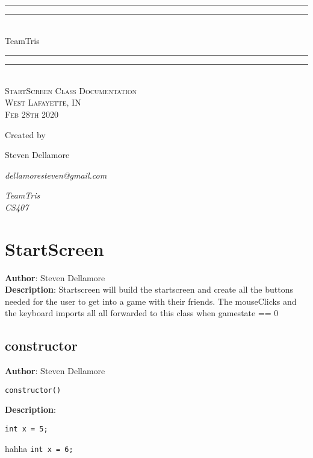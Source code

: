 \documentclass[12pt]{article}
\newlength{\drop}
\begin{document}
  \begin{titlepage}
    \centering
    \textheight
    \vspace*{7\baselineskip}
    \rule{\textwidth}{1.6pt}\vspace*{-\baselineskip}\vspace*{2pt}
    \rule{\textwidth}{0.4pt}\\[\baselineskip]
    {\LARGE TeamTris}\\[0.2\baselineskip]
    \rule{\textwidth}{0.4pt}\vspace*{-\baselineskip}\vspace{3.2pt}
    \rule{\textwidth}{1.6pt}\\[\baselineskip]
    \scshape
    StartScreen Class Documentation \\
    West Lafayette, IN \\
    Feb 28th 2020\par
    \vspace*{2\baselineskip}
    Created by \\[\baselineskip]
    {\Large Steven Dellamore\par}
    {\itshape dellamoresteven@gmail.com\par}
    {\itshape TeamTris \\ CS407\par}
  \end{titlepage}
  
\tableofcontents
\newpage


\section{StartScreen}
\textbf{Author}: Steven Dellamore \\
\textbf{Description}: Startscreen will build the startscreen and create all the buttons needed for the user to get into a game with their friends. The mouseClicks and the keyboard imports all all forwarded to this class when gamestate == 0 \\



\subsection{constructor}
\textbf{Author}: Steven Dellamore 
\vspace*{1\baselineskip}
\begin{lstlisting}
constructor()
\end{lstlisting} 
\vspace*{1\baselineskip}
\textbf{Description}: 
\begin{verbatim}
int x = 5; 
\end{verbatim}
 hahha \texttt{int x = 6;} 
\end{document}

